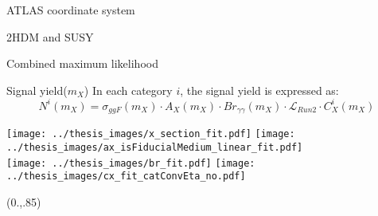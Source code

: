 \documentclass[10pt,UKenglish, leqno, xcolor = dvipsnames]{beamer}
\begin{document}
		\begin{frame}{ATLAS coordinate system}
			
		\end{frame}
	
		\begin{frame}{2HDM and SUSY}
			
		\end{frame}
		
		\begin{frame}{Combined maximum likelihood}
			
		\end{frame}
	
			\begin{frame}{Signal yield($m_X$)}
			\vfill
			In each category $i$, the signal yield is expressed as:
			$$
			N^i(m_X) = \sigma_{ggF}(m_X) \cdot A_X(m_X) \cdot Br_{\gamma\gamma}(m_X) \cdot \mathcal{L}_{Run2} \cdot C_X^i(m_X)
			$$
			\begin{center}
				\texttt{[image: ../thesis\_images/x\_section\_fit.pdf]}
				\texttt{[image: ../thesis\_images/ax\_isFiducialMedium\_linear\_fit.pdf]}\\
				\texttt{[image: ../thesis\_images/br\_fit.pdf]}			
				\texttt{[image: ../thesis\_images/cx\_fit\_catConvEta\_no.pdf]}
			\end{center}
			\vfill
			\begin{textblock}{1}(0.,.85)
				\begin{figure}
				\end{figure}
			\end{textblock}
		\end{frame}
\end{document}
